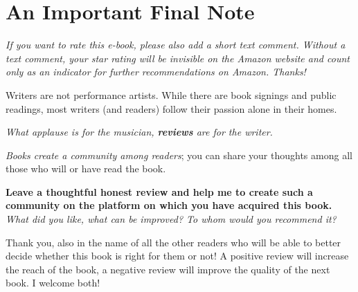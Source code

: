
\chapter{An Important Final Note}

\ifxetex \else \textit{If you want to rate this e-book, please also add a short text comment. Without a text comment, your star rating will be invisible on the Amazon website and count only as an indicator for further recommendations on Amazon. Thanks!}\fi

Writers are not performance artists. While there are book signings and public readings, most writers (and readers) follow their passion alone in their homes.

\textit{What applause is for the musician, \textbf{reviews} are for the writer.} 

\textit{Books create a community among readers}; you can share your thoughts among all those who will or have read the book.

\textbf{Leave a thoughtful honest review and help me to create such a community on the platform on which you have acquired this book.} \textit{What did you like, what can be improved? To whom would you recommend it?} 

Thank you, also in the name of all the other readers who will be able to better decide whether this book is right for them or not! A positive review will increase the reach of the book, a negative review will improve the quality of the next book. I welcome both!